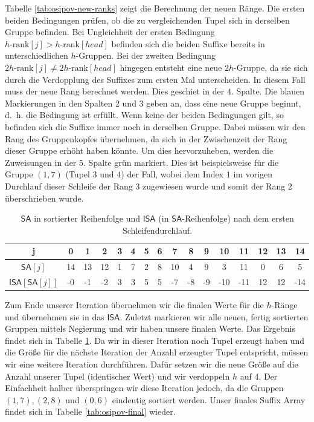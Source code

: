 Tabelle \ref{tab:osipov-new-ranks} zeigt die Berechnung der neuen Ränge. Die ersten beiden Bedingungen prüfen, ob die zu vergleichenden Tupel sich in derselben Gruppe befinden. Bei Ungleichheit der ersten Bedingung $h\text{-rank}[j] > h\text{-rank}[head]$ befinden sich die beiden Suffixe bereits in unterschiedlichen $h$-Gruppen. Bei der zweiten Bedingung $2h\text{-rank}[j] \neq 2h\text{-rank}[head]$ hingegen entsteht eine neue $2h$-Gruppe, da sie sich durch die Verdopplung des Suffixes zum ersten Mal unterscheiden. In diesem Fall muss der neue Rang berechnet werden. Dies geschiet in der $4.$ Spalte. Die blauen Markierungen in den Spalten $2$ und $3$ geben an, dass eine neue Gruppe beginnt, d.~h. die Bedingung ist erfüllt. Wenn keine der beiden Bedingungen gilt, so befinden sich die Suffixe immer noch in derselben Gruppe. Dabei müssen wir den Rang des Gruppenkopfes übernehmen, da sich in der Zwischenzeit der Rang dieser Gruppe erhöht haben könnte. Um dies hervorzuheben, werden die Zuweisungen in der $5.$ Spalte grün markiert. Dies ist beispielsweise für die Gruppe $(1,7)$ (Tupel $3$ und $4$) der Fall, wobei dem Index $1$ im vorigen Durchlauf dieser Schleife der Rang $3$ zugewiesen wurde und somit der Rang $2$ überschrieben wurde. 


\begin{table}[]
\begin{tabular}{|c|c|c|c|c|c|c|c|c|c|c|c|c|c|c|c|}
\hline
j                              & 0  & 1  & 2  & 3 & 4 & 5 & 6 & 7  & 8 & 9  & 10  & 11  & 12 & 13 & 14  \\ \hline
$\mathsf{SA}[j]$               & 14 & 13 & 12 & 1 & 7 & 2 & 8 & 10 & 4 & 9  & 3   & 11  & 0  & 6  & 5   \\ \hline
$\mathsf{ISA}[\mathsf{SA}[j]]$ & -0 & -1 & -2 & 3 & 3 & 5 & 5 & -7  & -8 & -9 & -10 & -11 & 12 & 12 & -14 \\ \hline
\end{tabular}
\caption{$\mathsf{SA}$ in sortierter Reihenfolge und $\mathsf{ISA}$ (in $\mathsf{SA}$-Reihenfolge) nach dem ersten Schleifendurchlauf.}
\label{tab:osipov-iteration}
\end{table}

Zum Ende unserer Iteration übernehmen wir die finalen Werte für die $h$-Ränge und übernehmen sie in das $\mathsf{ISA}$. Zuletzt markieren wir alle neuen, fertig sortierten Gruppen mittels Negierung und wir haben unsere finalen Werte. Das Ergebnis findet sich in Tabelle \ref{tab:osipov-iteration}. Da wir in dieser Iteration noch Tupel erzeugt haben und die Größe für die nächste Iteration der Anzahl erzeugter Tupel entspricht, müssen wir eine weitere Iteration durchführen. Dafür setzen wir die neue Größe auf die Anzahl unserer Tupel (identischer Wert) und wir verdoppeln $h$ auf $4$. Der Einfachheit halber überspringen wir diese Iteration jedoch, da die Gruppen $(1, 7), (2,8)$ und $(0,6)$ eindeutig sortiert werden. Unser finales Suffix Array findet sich in Tabelle \ref{tab:osipov-final} wieder.

